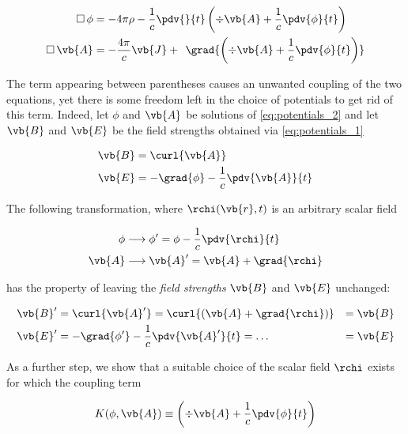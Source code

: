 \begin{subequations}
\label{eq:potentials_2}
\begin{align} 
\Box \, \phi &= - 4 \pi \rho - \frac{1}{c} \pdv{}{t} \left( \div{\vb{A}} + \frac{1}{c} \pdv{\phi}{t}  \right)
\label{eq:potentials_21} \\
\Box \, \vb{A} &= - \frac{4 \pi}{c} \vb{J} + \:\:\grad{\left( \div{\vb{A}} + \frac{1}{c} \pdv{\phi}{t}  \right)}
\label{eq:potentials_22} 
\end{align}
\end{subequations}

The term appearing between parentheses causes an unwanted coupling of the two equations, yet there is some freedom left in the choice of potentials to get rid of this term. Indeed, let $\phi$ and $\vb{A}$ be solutions of \ref{eq:potentials_2} and let $\vb{B}$ and $\vb{E}$ be the field strengths obtained via \ref{eq:potentials_1}

\begin{align*}
\vb{B} &= \curl{\vb{A}} \\
\vb{E} &= - \grad{\phi} - \frac{1}{c} \pdv{\vb{A}}{t} 
\end{align*}

The following transformation, where $\rchi(\vb{r}, t)$ is an arbitrary scalar field

\begin{equation}
\begin{aligned}
\phi & \longrightarrow \phi' = \phi - \frac{1}{c} \pdv{\rchi}{t} \\
\vb{A} & \longrightarrow \vb{A}' = \vb{A} + \grad{\rchi}
\end{aligned}
\label{eq:f01_gaugexform}
\end{equation}

has the property of leaving the \textit{field strengths}  $\vb{B}$ and $\vb{E}$ unchanged:

\begin{align*}
\vb{B}' &= \curl{\vb{A}'} = \curl{(\vb{A} + \grad{\rchi})} &= \vb{B} \\    
\vb{E}' &= - \grad{\phi'} - \frac{1}{c} \pdv{\vb{A}'}{t} =  \ldots  &= \vb{E}
\end{align*}

As a further step, we show that a suitable choice of the scalar field $\rchi$ exists for which the coupling term 

\begin{equation*}
K(\phi, \vb{A}) \equiv \left( \div{\vb{A}} + \frac{1}{c} \pdv{\phi}{t}  \right)
\end{equation*}

